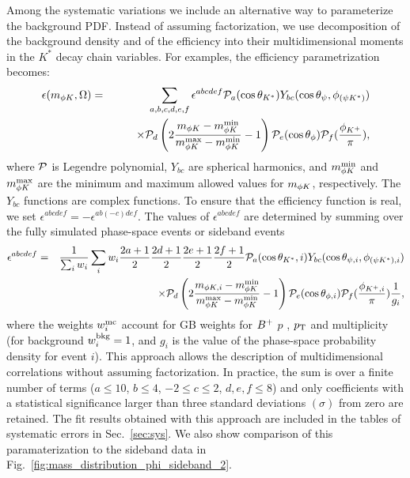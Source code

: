 Among the systematic variations we include an alternative way to
parameterize the background PDF. Instead of assuming factorization, we use decomposition of the background density and of the efficiency into their multidimensional moments in the $K^*$ decay chain variables. For examples, the efficiency parametrization becomes:
\begin{eqnarray}
\epsilon(m_{\phi K},\Omega) &=& \sum_{a,b,c,d,e,f}\epsilon^{abcdef}{\cal{P}}_a(\cos\theta_{K^*})Y_{bc}(\cos\theta_{\psi},\phi_{(\psi K^*)})\nonumber\\
&& \quad \quad \times {\cal{P}}_d\left(2\frac{m_{\phi K}-m_{\phi K}^{\rm min}}{m_{\phi K}^{\rm max}-m_{\phi K}^{\rm min}}-1\right) {\cal{P}}_e(\cos\theta_{\phi}){\cal{P}}_f(\frac{\phi_{{K}^+}}{\pi}),
\end{eqnarray}\label{EqEff}
where ${\cal{P}}$ is Legendre polynomial, $Y_{bc}$ are spherical harmonics, and $m_{\phi K}^{\rm min}$ and $m_{\phi K}^{\rm max}$ are the minimum and maximum allowed values for $m_{\phi K}$, respectively. The $Y_{bc}$ functions are complex functions. To ensure that the efficiency function is real, we set $\epsilon^{abcdef}=-\epsilon^{ab(-c)def}$. The values of $\epsilon^{abcdef}$ are determined by summing over the fully simulated phase-space events or sideband events
\begin{eqnarray}\label{eq:effco}
\epsilon^{abcdef}&=&\frac{1}{\sum_i w_i}\sum_i w_i \frac{2a+1}{2}\frac{2d+1}{2} \frac{2e+1}{2}\frac{2f+1}{2}{\cal{P}}_a(\cos\theta_{K^*},i)Y_{bc}(\cos\theta_{\psi,i},\phi_{(\psi K^*),i})\nonumber\\
&&\quad \quad \times {\cal{P}}_d\left(2\frac{m_{\phi K,i}-m_{\phi K}^{\rm min}}{m_{\phi K}^{\rm max}-m_{\phi K}^{\rm min}}-1\right) {\cal{P}}_e(\cos\theta_{\phi,i}){\cal{P}}_f(\frac{\phi_{{{K}^+},i}}{\pi})\frac{1}{g_i},
\end{eqnarray}
where the weights $w^{\rm mc}_i$ account for GB weights for ${{{B}^+}}$ $p$ , $p_{\mathrm{T}}$ and multiplicity (for background $w_i^{\rm bkg}=1$, and $g_i$ is the value of the phase-space probability density for event $i$). This approach allows the description of multidimensional correlations without assuming factorization. In practice, the sum is over a finite number of terms ($a\leq10$, $b\leq4$, $-2\leq c\leq2$, $d,e,f\leq8$) and only coefficients with a statistical significance larger than three standard deviations $(\sigma)$ from zero are retained. The fit results obtained with this approach are included in the tables of systematic errors in Sec.~\ref{sec:sys}.
We also show comparison of this paramaterization to the sideband data in Fig.~\ref{fig:mass_distribution_phi_sideband_2}.



